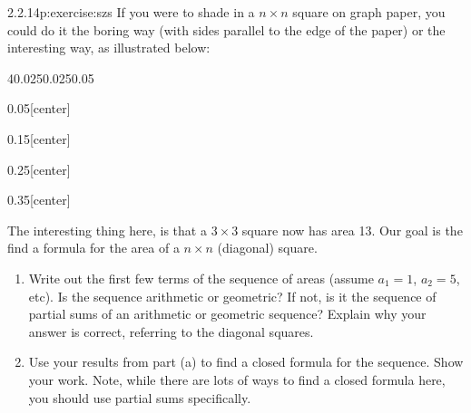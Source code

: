 \documentclass[twoside,11pt,]{book}
\numberwithin{equation}{chapter}
\begin{document}
\begin{divisionsolution}{2.2.14}{}{p:exercise:szs}%
If you were to shade in a \(n\times n\) square on graph paper, you could do it the boring way (with sides parallel to the edge of the paper) or the interesting way, as illustrated below:%
\begin{sidebyside}{4}{0.025}{0.025}{0.05}%
\begin{sbspanel}{0.05}[center]%
%
\end{sbspanel}%
\begin{sbspanel}{0.15}[center]%
%
\end{sbspanel}%
\begin{sbspanel}{0.25}[center]%
%
\end{sbspanel}%
\begin{sbspanel}{0.35}[center]%
%
\end{sbspanel}%
\end{sidebyside}%
\par
The interesting thing here, is that a \(3\times 3\) square now has area 13. Our goal is the find a formula for the area of a \(n \times n\) (diagonal) square.%
\begin{enumerate}[label=(\alph*)]
\item{}Write out the first few terms of the sequence of areas (assume \(a_1 = 1\), \(a_2 = 5\), etc). Is the sequence arithmetic or geometric? If not, is it the sequence of partial sums of an arithmetic or geometric sequence? Explain why your answer is correct, referring to the diagonal squares.%
\item{}Use your results from part (a) to find a closed formula for the sequence. Show your work. Note, while there are lots of ways to find a closed formula here, you should use partial sums specifically.%

\end{enumerate}
\end{divisionsolution}
\end{document}
